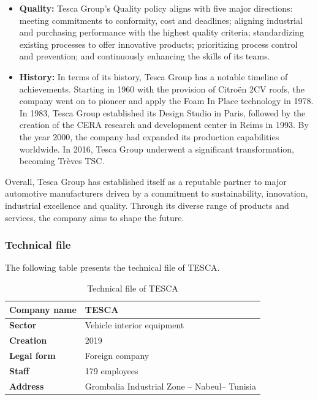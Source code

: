 \begin{itemize}

    \item \textbf{Quality:} Tesca Group's Quality policy aligns with five major directions: meeting commitments to conformity, cost and deadlines; aligning industrial and purchasing performance with the highest quality criteria; standardizing existing processes to offer innovative products; prioritizing process control and prevention; and continuously enhancing the skills of its teams\cite{tesca_official}.

\end{itemize}



\begin{itemize}

    \item \textbf{History:} In terms of its history, Tesca Group has a notable timeline of achievements. Starting in 1960 with the provision of Citro\"en 2CV roofs, the company went on to pioneer and apply the Foam In Place technology in 1978. In 1983, Tesca Group established its Design Studio in Paris, followed by the creation of the CERA research and development center in Reims in 1993. By the year 2000, the company had expanded its production capabilities worldwide. In 2016, Tesca Group underwent a significant transformation, becoming Tr\`eves TSC\cite{tesca_official}.

\end{itemize}



\hspace*{0.25cm}Overall, Tesca Group has established itself as a reputable partner to major automotive manufacturers
driven by a commitment to sustainability, innovation, industrial excellence and quality. Through its
diverse range of products and services, the company aims to shape the future\cite{tesca_official}.

\subsubsection{\fontsize{13}{16}\selectfont Technical file}

The following table presents the technical file of TESCA.

\begin{table}[H]
    \centering
    \caption{Technical file of TESCA}
    \begin{tabular}{|l|l|}
        \hline
        \textbf{Company name} & \textbf{TESCA} \\
        \hline
        \textbf{Sector} & Vehicle interior equipment \\
        \hline
        \textbf{Creation} & 2019 \\
        \hline
        \textbf{Legal form} & Foreign company \\
        \hline
        \textbf{Staff} & 179 employees \\
        \hline
        \textbf{Address} & Grombalia Industrial Zone – Nabeul– Tunisia \\
        \hline
    \end{tabular}
\end{table}

